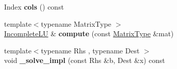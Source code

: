 \begin{DoxyCompactItemize}
\mbox{\label{class_eigen_1_1_incomplete_l_u_a976a4a54494f793c67d95513bd55d941}} 
Index {\bfseries cols} () const
\item 
\mbox{\label{class_eigen_1_1_incomplete_l_u_aa5af1411dde3ca1d290ac229c04d3d46}} 
{\footnotesize template$<$typename Matrix\+Type $>$ }\\\hyperlink{class_eigen_1_1_incomplete_l_u}{Incomplete\+LU} \& {\bfseries compute} (const \hyperlink{group___core___module}{Matrix\+Type} \&mat)
\item 
\mbox{\label{class_eigen_1_1_incomplete_l_u_aa4ecefd8c9ee6400122451596b4cb9ec}} 
{\footnotesize template$<$typename Rhs , typename Dest $>$ }\\void {\bfseries \+\_\+solve\+\_\+impl} (const Rhs \&b, Dest \&x) const
\end{DoxyCompactItemize}

